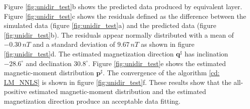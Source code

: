 Figure \ref{fig:unidir_test}b shows the predicted data produced by equivalent layer. 
Figure \ref{fig:unidir_test}c shows the residuals defined as the difference between the simulated data (figure \ref{fig:unidir_test}a) and the predicted data (figure \ref{fig:unidir_test}b). The residuals appear normally distributed with a mean of $-0.30 \, nT$ and a standard deviation of $9.67 \, nT$ as shown in figure \ref{fig:unidir_test}d. The estimated magnetization direction $\mathbf{q}^\sharp$ has inclination $-28.6^\circ$ and declination $30.8^\circ$. Figure \ref{fig:unidir_test}e shows the estimated magnetic-moment distribution $\mathbf{p}^\sharp$. The convergence of the algorithm \ref{cd: LM_NNLS} is shown in figure \ref{fig:unidir_test}f. These results show that the all-positive estimated magnetic-moment distribution and the estimated magnetization direction produce an acceptable data fitting.


